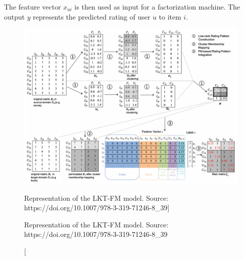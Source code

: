 The feature vector $x_{ui}$ is then used as input for a factorization machine. The output $y$ represents the predicted rating of user $u$ to item $i$.
\begin{figure}[hbt]
\centering
\includegraphics[width=\textwidth]{pictures/lkt-fm}
\caption
[Representation of the LKT-FM model. Source: https://doi.org/10.1007/978-3-319-71246-8\_39]
{\protect\raggedright Representation of the LKT-FM model. Source: https://doi.org/10.1007/978-3-319-71246-8\_39}
\end{figure}